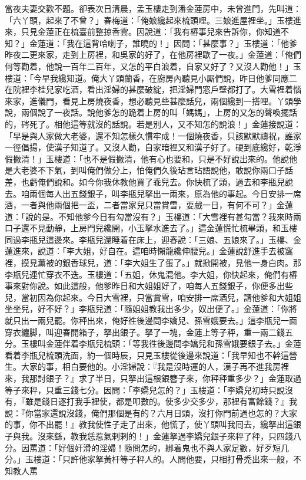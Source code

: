 當夜夫妻交歡不題。卻表次日清晨，孟玉樓走到潘金蓮房中，未曾進門，先叫道：「六丫頭，起來了不曾？」春梅道：「俺娘纔起來梳頭哩。三娘進屋裡坐。」玉樓進來，只見金蓮正在梳臺前整掠香雲。因說道：「我有樁事兒來告訴你，你知道不知？」金蓮道：「我在這背哈喇子，誰曉的！」因問：「甚麼事？」玉樓道：「他爹昨夜二更來家，走到上房裡，和吳家的好了，{}在他房裡歇了一夜。」金蓮道：「俺們何等勸着，他說一百年二百年，又怎的平白浪着，自家又好了？又沒人勸他！」玉樓道：「今早我纔知道。俺大丫頭蘭香，在廚房內聽見小厮們說，昨日他爹同應二在院裡李桂兒家吃酒，看出淫婦的甚麼破綻，把淫婦門窓戶壁都打了。大雪裡着惱來家，進儀門，看見上房燒夜香，想必聽見些甚麼話兒，{}兩個纔到一搭哩。丫頭學說，兩個說了一夜話。說他爹怎的跪着上房的叫「媽媽」，{}上房的又怎的聲喚擺話的，硶死了。相他這等就沒的話說。若是別人，又不知怎的說浪！」{}金蓮接說道：「早是與人家做大老婆，還不知怎樣久慣牢成！一個燒夜香，只該默默禱祝，誰家一徑倡揚，使漢子知道了。又沒人勸，自家暗裡又和漢子好了。硬到底纔好，乾淨假撇清！」玉樓道：「也不是假撇清，{}他有心也要和，只是不好說出來的。他說他是大老婆不下氣，到叫俺們做分上，怕俺們久後玷言玷語說他，敢說你兩口子話差，也虧俺們說和。{}如今你我休教他買了乖兒去。你快梳了頭，過去和李瓶兒說去。咱兩個每人出五錢銀子，叫李瓶兒拏出一兩來，原為他的事起。今日安排一席酒，一者與他兩個把一盃，二者當家兒只當賞雪，耍戲一日，有何不可？」金蓮道：「說的是。不知他爹今日有勾當沒有？」玉樓道：「大雪裡有甚勾當？我來時兩口子還不見動靜，上房門兒纔開，小玉拏水進去了。」這金蓮慌忙梳畢頭，和玉樓同過李瓶兒這邊來。李瓶兒還睡着在床上，迎春說：「三娘、五娘來了。」玉樓、金蓮進來，說道：「李大姐，好自在。這咱時懶龍纔伸腰兒。」金蓮說舒進手去被窩裡，摸見薰被的銀香球兒{}，道：「李大姐生了蛋了。」{}就掀開被，見他一身白肉。那李瓶兒連忙穿衣不迭。玉樓道：「五姐，休鬼混他。李大姐，你快起來，俺們有樁事來對你說。如此這般，他爹昨日和大姐姐好了，咱每人五錢銀子，你便多出些兒，當初因為你起來。今日大雪裡，只當賞雪，咱安排一席酒兒，請他爹和大姐姐坐坐兒，好不好？」李瓶兒道：「隨姐姐教我出多少，奴出便了。」金蓮道：「你將就只出一兩兒罷。{}你秤出來，俺好徃後邊問李嬌兒、孫雪娥要去。」這李瓶兒一面穿衣纏脚，叫迎春開箱子，拏出銀子。拏了一塊，金蓮上等子秤，重一兩二錢五分。玉樓叫金蓮伴着李瓶兒梳頭：「等我徃後邊問李嬌兒和孫雪娥要銀子去。」金蓮看着李瓶兒梳頭洗面，約一個時辰，只見玉樓從後邊來說道：「我早知也不幹這營生。大家的事，相白要他的。小淫婦說：『我是沒時運的人，漢子再不進我房裡來，我那討銀子？』求了半日，只拏出這根銀簪子來，你秤秤重多少？」金蓮取過等子來秤，只重三錢七分。因問：「李嬌兒怎的？」玉樓道：「李嬌兒初時只說沒有，『雖是錢日逐打我手裡使，都是叩數的。使多少交多少，那裡有富餘錢？』我說：『你當家還說沒錢，俺們那個是有的？{}六月日頭，沒打你門前過也怎的？大家的事，你不出罷！』教我使性子走了出來，他慌了，使丫頭叫我囘去，纔拏出這銀子與我。沒來繇，教我恁惹氣剌剌的！」金蓮拏過李嬌兒銀子來秤了秤，只四錢八分。因罵道：「好個奸滑的淫婦！隨問怎的，綁着鬼也不與人家足數，好歹短几分。」玉樓道：「只許他家拏黃杆等子秤人的。{}人問他要，只相打骨禿出來一般，不知教人罵